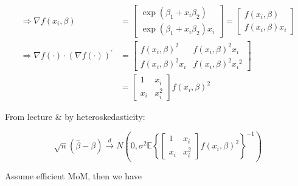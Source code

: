 {{\begin{enumerate}[label=(\arabic*)]
{$$
\begin{aligned}
\Rightarrow \nabla f\left(x_{i}, \beta\right)&=\left[\begin{array}{l}
\exp \left(\beta_{1}+x_{i} \beta_{2}\right) \\
\exp \left(\beta_{1}+x_{i} \beta_{2}\right) x_{i}
\end{array}\right]=\left[\begin{array}{l}
f\left(x_{i}, \beta\right) \\
f\left(x_{i}, \beta\right) x_{i}
\end{array}\right] \\
\Rightarrow \nabla f(\cdot) \cdot(\nabla f(\cdot))^{\prime}&=\left[\begin{array}{ll}
f\left(x_{i}, \beta\right)^{2} & f\left(x_{i}, \beta\right)^{2} x_{i} \\
f\left(x_{i}, \beta\right)^{2} x_{i} & f\left(x_{i}, \beta\right)^{2} x_{i}{ }^{2}
\end{array}\right] \\
& =\left[\begin{array}{ll}
1 & x_{i} \\
x_{i} & x_{i}^{2}
\end{array}\right] f\left(x_{i}, \beta\right)^{2}
\end{aligned}
$$

From lecture \& by heteroskedasticity:

$$
\sqrt{n}(\hat{\beta}-\beta) \xrightarrow{d} N\left(0, \sigma^{2} \mathbb{E}\left\{\left[\begin{array}{ll}
1 & x_{i} \\
x_{i} & x_{i}^{2}
\end{array}\right] f\left(x_{i}, \beta\right)^{2}\right\}^{-1}\right)
$$
}
{\item 
Assume efficient MoM, then we have

}
\end{enumerate}}}
